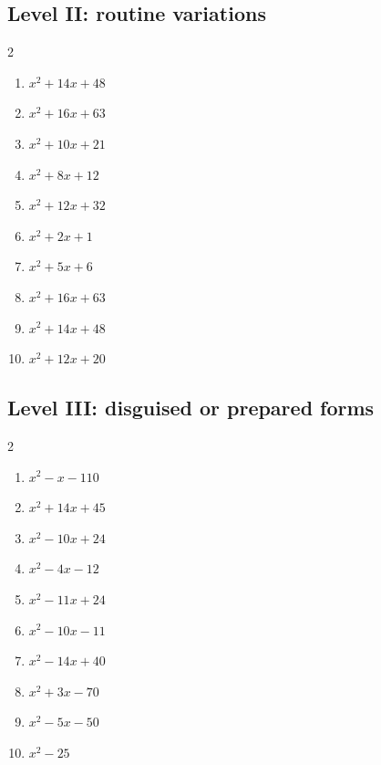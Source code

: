 \documentclass[11pt,oneside]{book}
\begin{document}
\subsection*{Level II: routine variations}
\begin{multicols}{2}
\begin{enumerate}[leftmargin=*,label=\textbf{\arabic*.},itemsep=0.65\baselineskip]
\item $ x^{2} + 14 x + 48 $
\item $ x^{2} + 16 x + 63 $
\item $ x^{2} + 10 x + 21 $
\item $ x^{2} + 8 x + 12 $
\item $ x^{2} + 12 x + 32 $
\item $ x^{2} + 2 x + 1 $
\item $ x^{2} + 5 x + 6 $
\item $ x^{2} + 16 x + 63 $
\item $ x^{2} + 14 x + 48 $
\item $ x^{2} + 12 x + 20 $
\end{enumerate}
\end{multicols}
\subsection*{Level III: disguised or prepared forms}
\begin{multicols}{2}
\begin{enumerate}[leftmargin=*,label=\textbf{\arabic*.},itemsep=0.65\baselineskip]
\item $ x^{2} - x - 110 $
\item $ x^{2} + 14 x + 45 $
\item $ x^{2} - 10 x + 24 $
\item $ x^{2} - 4 x - 12 $
\item $ x^{2} - 11 x + 24 $
\item $ x^{2} - 10 x - 11 $
\item $ x^{2} - 14 x + 40 $
\item $ x^{2} + 3 x - 70 $
\item $ x^{2} - 5 x - 50 $
\item $ x^{2} - 25 $
\end{enumerate}
\end{multicols}
\end{document}
